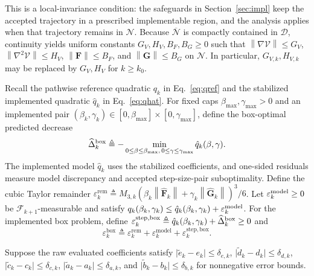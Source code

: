 \documentclass[journal]{IEEEtran}
\theoremstyle{remark}
\newcommand{\norm}[1]{\left\lVert #1\right\rVert}
\newcommand{\cD}{\mathcal{D}}
\newcommand{\cN}{\mathcal{N}}
\newcommand{\bF}{\boldsymbol{F}}
\newcommand{\bG}{\boldsymbol{G}}
\newcommand{\hatF}{\widehat{\boldsymbol{F}}}
\newcommand{\hatG}{\widehat{\boldsymbol{G}}}
\newcommand{\Vk}{\mathcal{V}}
\begin{document}
	This is a local-invariance condition: the safeguards in Section~\ref{sec:impl} keep the accepted trajectory in a prescribed implementable region, and the analysis applies when that trajectory remains in $\cN$.
	Because $\overline{\cN}$ is compactly contained in $\cD$, continuity yields uniform constants $G_V,H_V,B_F,B_G\ge0$ such that $\norm{\nabla\Vk}\le G_V$, $\norm{\nabla^2\Vk}\le H_V$, $\norm{\bF}\le B_F$, and $\norm{\bG}\le B_G$ on $\cN$.
	In particular, $G_{V,k},H_{V,k}$ may be replaced by $G_V,H_V$ for $k\ge k_0$.
	
	Recall the pathwise reference quadratic $q_k$ in Eq.~\eqref{eq:qref} and the stabilized implemented quadratic $\hat q_k$ in Eq.~\eqref{eq:qhat}.
	For fixed caps $\beta_{\max},\gamma_{\max}>0$ and an implemented pair $(\beta_k,\gamma_k)\in[0,\beta_{\max}]\times[0,\gamma_{\max}]$, define the box-optimal predicted decrease
	\[
	\widehat\Delta_k^{\rm box}
	\triangleq
	-\min_{0\le\beta\le\beta_{\max},\,0\le\gamma\le\gamma_{\max}}
	\hat q_k(\beta,\gamma).
	\]
	The implemented model $\hat q_k$ uses the stabilized coefficients, and one-sided residuals measure model discrepancy and accepted step-size-pair suboptimality.
	Define the cubic Taylor remainder $\varepsilon_{k}^{\mathrm{rem}}\triangleq M_{3,k} (\beta_{k}\norm{\hatF_{k}}+\gamma_{k}\norm{\hatG_{k}})^{3}/6$.
	Let $\varepsilon_k^{\rm model}\ge0$ be $\mathscr F_{k+1}$-measurable and satisfy $q_k(\beta_k,\gamma_k)\le\hat q_k(\beta_k,\gamma_k) +\varepsilon_k^{\rm model}$.
	For the implemented box problem, define $\varepsilon_k^{\rm step,box}\triangleq\hat q_k(\beta_k,\gamma_k)+\widehat\Delta_k^{\rm box}\ge0$ and
	\begin{equation}\label{eq:eps_tot}
		\varepsilon_{k}^{\mathrm{box}}
		\triangleq
		\varepsilon_{k}^{\mathrm{rem}}+\varepsilon_{k}^{\mathrm{model}}
		+\varepsilon_{k}^{\mathrm{step,box}}.
	\end{equation}
	
	Suppose the raw evaluated coefficients satisfy $\lvert\tilde e_{k}-e_{k}\rvert\le\delta_{e,k}$, $\lvert\tilde d_{k}-d_{k}\rvert\le\delta_{d,k}$, $\lvert\tilde c_{k}-c_{k}\rvert\le\delta_{c,k}$, $\lvert\tilde a_{k}-a_{k}\rvert\le\delta_{a,k}$, and $\lvert\tilde b_{k}-b_{k}\rvert\le\delta_{b,k}$ for nonnegative error bounds.
	
\end{document}
